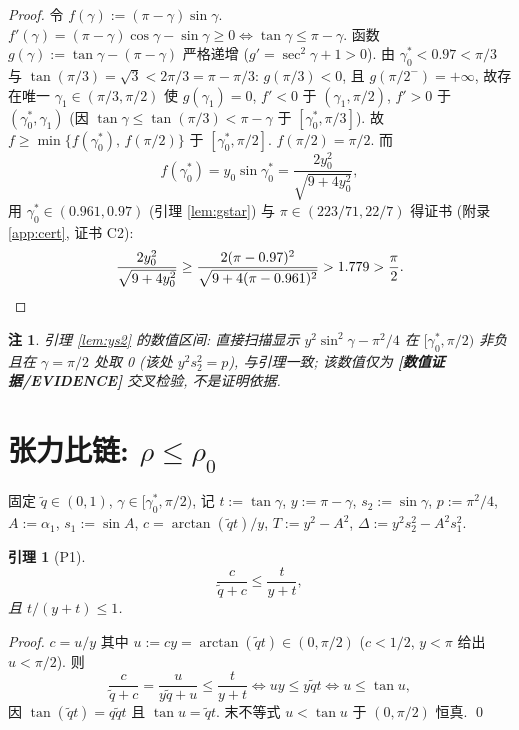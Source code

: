 \documentclass[UTF8]{ctexart}
\newtheorem{lemma}[theorem]{引理}
\newtheorem{remark}[theorem]{注}
\newcommand{\EVID}{\textbf{[数值证据/EVIDENCE]}}
\begin{document}
\begin{proof}
令 $f(\gamma):=(\pi-\gamma)\sin\gamma$. $f'(\gamma)=(\pi-\gamma)\cos\gamma-\sin\gamma
\ge0\iff\tan\gamma\le\pi-\gamma$. 函数 $g(\gamma):=\tan\gamma-(\pi-\gamma)$ 严格递增
($g'=\sec^2\gamma+1>0$). 由 $\gamma_0^*<0.97<\pi/3$ 与
$\tan(\pi/3)=\sqrt3<2\pi/3=\pi-\pi/3$: $g(\pi/3)<0$, 且 $g(\pi/2^-)=+\infty$,
故存在唯一 $\gamma_1\in(\pi/3,\pi/2)$ 使 $g(\gamma_1)=0$, $f'<0$ 于
$(\gamma_1,\pi/2)$, $f'>0$ 于 $(\gamma_0^*,\gamma_1)$ (因
$\tan\gamma\le\tan(\pi/3)<\pi-\gamma$ 于 $[\gamma_0^*,\pi/3]$).
故 $f\ge\min\{f(\gamma_0^*),\,f(\pi/2)\}$ 于 $[\gamma_0^*,\pi/2]$.
$f(\pi/2)=\pi/2$. 而
\begin{equation}
	f(\gamma_0^*)=y_0\sin\gamma_0^*=\frac{2y_0^2}{\sqrt{9+4y_0^2}},
\end{equation}
用 $\gamma_0^*\in(0.961,0.97)$ (引理 \ref{lem:gstar}) 与
$\pi\in(223/71,22/7)$ 得证书 (附录 \ref{app:cert}, 证书 C2):
\begin{equation*}
	\frac{2y_0^2}{\sqrt{9+4y_0^2}}\ge\frac{2(\pi-0.97)^2}
	{\sqrt{9+4(\pi-0.961)^2}}>1.779>\frac\pi2.
	\qedhere
\end{equation*}
\end{proof}

\begin{remark}
引理 \ref{lem:ys2} 的数值区间: 直接扫描显示 $y^2\sin^2\gamma-\pi^2/4$ 在
$[\gamma_0^*,\pi/2)$ 非负且在 $\gamma=\pi/2$ 处取 0 (该处 $y^2s_2^2=p$),
与引理一致; 该数值仅为 \EVID{} 交叉检验, 不是证明依据.
\end{remark}

\section{\texorpdfstring{张力比链: $\rho\le\rho_0$}{张力比链: rho <= rho0}}\label{sec:chain}

固定 $\tilde q\in(0,1)$, $\gamma\in[\gamma_0^*,\pi/2)$, 记 $t:=\tan\gamma$,
$y:=\pi-\gamma$, $s_2:=\sin\gamma$, $p:=\pi^2/4$, $A:=\alpha_1$,
$s_1:=\sin A$, $c=\arctan(\tilde q t)/y$, $T:=y^2-A^2$,
$\Delta:=y^2s_2^2-A^2s_1^2$.

\begin{lemma}[P1]\label{lem:P1}
\begin{equation}
	\frac{c}{\tilde q+c}\le\frac{t}{y+t},
	\label{eq:P1}
\end{equation}
且 $t/(y+t)\le1$.
\end{lemma}

\begin{proof}
$c=u/y$ 其中 $u:=cy=\arctan(\tilde q t)\in(0,\pi/2)$
($c<1/2$, $y<\pi$ 给出 $u<\pi/2$). 则
\begin{equation*}
	\frac{c}{\tilde q+c}=\frac{u}{y\tilde q+u}\le\frac{t}{y+t}
	\iff uy\le y\tilde q t\iff u\le\tan u,
\end{equation*}
因 $\tan(\tilde q t)=q\tilde q t$ 且 $\tan u=\tilde q t$. 末不等式 $u<\tan u$
于 $(0,\pi/2)$ 恒真. \qed
\end{proof}
\end{document}
